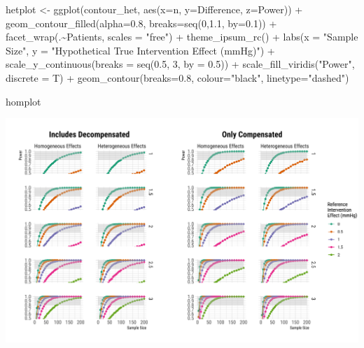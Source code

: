 \documentclass[
]{article}
\newenvironment{Shaded}{\begin{snugshade}}{\end{snugshade}}
\newcommand{\AttributeTok}[1]{\textcolor[rgb]{0.77,0.63,0.00}{#1}}
\newcommand{\DecValTok}[1]{\textcolor[rgb]{0.00,0.00,0.81}{#1}}
\newcommand{\FloatTok}[1]{\textcolor[rgb]{0.00,0.00,0.81}{#1}}
\newcommand{\FunctionTok}[1]{\textcolor[rgb]{0.00,0.00,0.00}{#1}}
\newcommand{\NormalTok}[1]{#1}
\newcommand{\OtherTok}[1]{\textcolor[rgb]{0.56,0.35,0.01}{#1}}
\newcommand{\SpecialCharTok}[1]{\textcolor[rgb]{0.00,0.00,0.00}{#1}}
\newcommand{\StringTok}[1]{\textcolor[rgb]{0.31,0.60,0.02}{#1}}
\begin{document}
\begin{Shaded}
\begin{Highlighting}[]
\NormalTok{hetplot }\OtherTok{\textless{}{-}} \FunctionTok{ggplot}\NormalTok{(contour\_het, }\FunctionTok{aes}\NormalTok{(}\AttributeTok{x=}\NormalTok{n, }\AttributeTok{y=}\NormalTok{Difference, }\AttributeTok{z=}\NormalTok{Power)) }\SpecialCharTok{+}
  \FunctionTok{geom\_contour\_filled}\NormalTok{(}\AttributeTok{alpha=}\FloatTok{0.8}\NormalTok{, }\AttributeTok{breaks=}\FunctionTok{seq}\NormalTok{(}\DecValTok{0}\NormalTok{,}\FloatTok{1.1}\NormalTok{, }\AttributeTok{by=}\FloatTok{0.1}\NormalTok{)) }\SpecialCharTok{+}
  \FunctionTok{facet\_wrap}\NormalTok{(.}\SpecialCharTok{\textasciitilde{}}\NormalTok{Patients, }\AttributeTok{scales =} \StringTok{"free"}\NormalTok{) }\SpecialCharTok{+}
  \FunctionTok{theme\_ipsum\_rc}\NormalTok{() }\SpecialCharTok{+}
  \FunctionTok{labs}\NormalTok{(}\AttributeTok{x =} \StringTok{"Sample Size"}\NormalTok{,}
       \AttributeTok{y =} \StringTok{"Hypothetical True Intervention Effect (mmHg)"}\NormalTok{) }\SpecialCharTok{+}
  \FunctionTok{scale\_y\_continuous}\NormalTok{(}\AttributeTok{breaks =} \FunctionTok{seq}\NormalTok{(}\FloatTok{0.5}\NormalTok{, }\DecValTok{3}\NormalTok{, }\AttributeTok{by =} \FloatTok{0.5}\NormalTok{)) }\SpecialCharTok{+}
  \FunctionTok{scale\_fill\_viridis}\NormalTok{(}\StringTok{"Power"}\NormalTok{, }\AttributeTok{discrete =}\NormalTok{ T) }\SpecialCharTok{+}
  \FunctionTok{geom\_contour}\NormalTok{(}\AttributeTok{breaks=}\FloatTok{0.8}\NormalTok{, }\AttributeTok{colour=}\StringTok{"black"}\NormalTok{, }\AttributeTok{linetype=}\StringTok{"dashed"}\NormalTok{)}

\NormalTok{homplot}
\end{Highlighting}
\end{Shaded}

\includegraphics{figures/unnamed-chunk-66-1.png}
\end{document}
